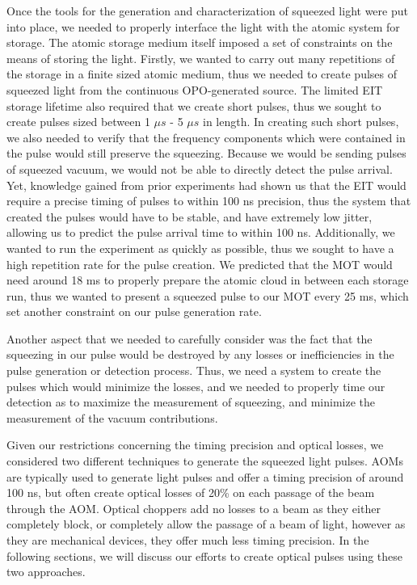 Once the tools for the generation and characterization of squeezed light were put into place, we needed to properly interface the light with the atomic system for storage.  The atomic storage medium itself imposed a set of constraints on the means of storing the light.  Firstly, we wanted to carry out many repetitions of the storage in a finite sized atomic medium, thus we needed to create pulses of squeezed light from the continuous OPO-generated source.  The limited EIT storage lifetime also required that we create short pulses, thus we sought to create pulses sized between 1 $\mu s$ - 5 $\mu s$  in length.  In creating such short pulses, we also needed to verify that the frequency components which were contained in the pulse would still preserve the squeezing.  Because we would be sending pulses of squeezed vacuum, we would not be able to directly detect the pulse arrival.  Yet, knowledge gained from prior experiments \cite{CviklinskiPhD} had shown us that the EIT would require a precise timing of pulses to within 100 ns precision, thus the system that created the pulses would have to be stable, and have extremely low jitter, allowing us to predict the pulse arrival time to within 100 ns.  Additionally, we wanted to run the experiment as quickly as possible, thus we sought to have a high repetition rate for the pulse creation.  We predicted that the MOT would need around 18 ms to properly prepare the atomic cloud in between each storage run, thus we wanted to present a squeezed pulse to our MOT every 25 ms, which set another constraint on our pulse generation rate.

Another aspect that we needed to carefully consider was the fact that the squeezing in our pulse would be destroyed by any losses or inefficiencies in the pulse generation or detection process.  Thus, we need a system to create the pulses which would minimize the losses, and we needed to properly time our detection as to maximize the measurement of squeezing, and minimize the measurement of the vacuum contributions.

Given our restrictions concerning the timing precision and optical losses, we considered two different techniques to generate the squeezed light pulses.  AOMs are typically used to generate light pulses and offer a timing precision of around 100 ns, but often create optical losses of 20\% on each passage of the beam through the AOM.  Optical choppers add no losses to a beam as they either completely block, or completely allow the passage of a beam of light, however as they are mechanical devices, they offer much less timing precision.  In the following sections, we will discuss our efforts to create optical pulses using these two approaches.


